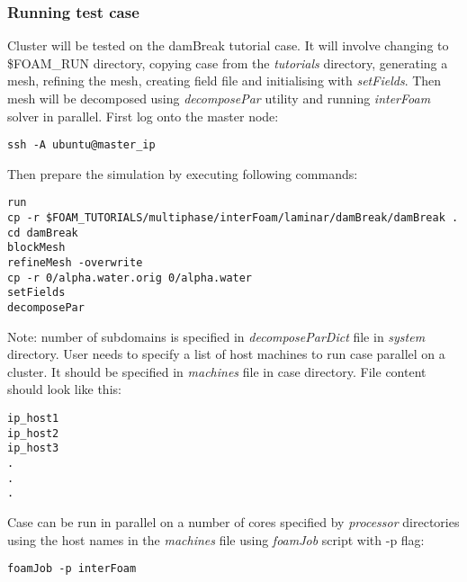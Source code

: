 \documentclass[12pt,english]{article}
\begin{document}
\subsubsection{Running test case}
Cluster will be tested on the damBreak tutorial case. It will involve changing to \$FOAM\_RUN directory, copying case from the \textit{tutorials} directory, generating a mesh, refining the mesh, creating field file and initialising with \textit{setFields}. Then mesh will be decomposed using \textit{decomposePar} utility and running \textit{interFoam} solver in parallel.
First log onto the master node:
\begin{lstlisting}
ssh -A ubuntu@master_ip
\end{lstlisting}
Then prepare the simulation by executing following commands:
\begin{lstlisting}
run
cp -r $FOAM_TUTORIALS/multiphase/interFoam/laminar/damBreak/damBreak .
cd damBreak
blockMesh
refineMesh -overwrite
cp -r 0/alpha.water.orig 0/alpha.water
setFields
decomposePar
\end{lstlisting}
Note: number of subdomains is specified in \textit{decomposeParDict} file in \textit{system} directory.
User needs to specify a list of host machines to run case parallel on a cluster. It should be specified in \textit{machines} file in case directory. File content should look like this:
\begin{lstlisting}
ip_host1
ip_host2
ip_host3
.
.
.
\end{lstlisting}
Case can be run in parallel on a number of cores specified by \textit{processor} directories using the host names in the \textit{machines} file using \textit{foamJob} script with -p flag:
\begin{lstlisting}
foamJob -p interFoam
\end{lstlisting}
\end{document}
